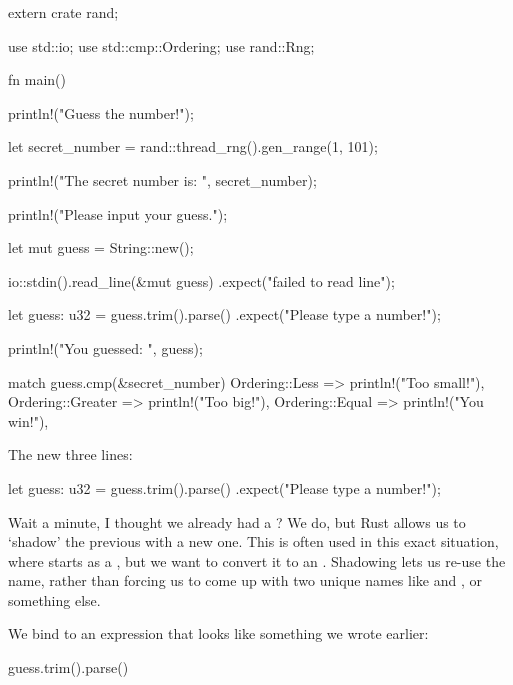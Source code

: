 \begin{rustc}
extern crate rand;

use std::io;
use std::cmp::Ordering;
use rand::Rng;

fn main() {
    println!("Guess the number!");

    let secret_number = rand::thread_rng().gen_range(1, 101);

    println!("The secret number is: {}", secret_number);

    println!("Please input your guess.");

    let mut guess = String::new();

    io::stdin().read_line(&mut guess)
        .expect("failed to read line");

    let guess: u32 = guess.trim().parse()
        .expect("Please type a number!");

    println!("You guessed: {}", guess);

    match guess.cmp(&secret_number) {
        Ordering::Less    => println!("Too small!"),
        Ordering::Greater => println!("Too big!"),
        Ordering::Equal   => println!("You win!"),
    }
}
\end{rustc}

The new three lines:

\begin{rustc}
    let guess: u32 = guess.trim().parse()
        .expect("Please type a number!");
\end{rustc}

Wait a minute, I thought we already had a ? We do, but Rust allows us to ‘shadow’ the previous  with a new
one. This is often used in this exact situation, where  starts as a , but we want to convert it to an 
. Shadowing lets us re-use the  name, rather than forcing us to come up with two unique names like 
 and , or something else.

\blank

We bind  to an expression that looks like something we wrote earlier:

\begin{rustc}
guess.trim().parse()
\end{rustc}

